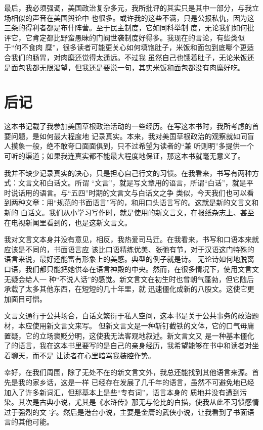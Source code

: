 ﻿\documentclass[11pt]{article}
\begin{document}
最后，我必须强调，美国政治复杂多元，我所批评的其实只是其中一部分，与我立场相似的声音在美国舆论中
也很多。或许我的这些不满，只是公报私仇，因为这三条的得利者都是布什阵营。至于民主制度，它如同科举制
度，无论我们如何批评它，它肯定都比野蛮愚昧的门阀世袭制度好得多。我现在的言论，有些类似于``何不食肉
糜''，很多读者可能更关心如何填饱肚子，米饭和面包到底哪个更适合我们的肠胃，对肉糜还觉得太遥远。不过我
虽然自己也饿着肚子，无论米饭还是面包我都无限渴望，但我还是要说一句，其实米饭和面包都没有肉糜好吃。

\section{后记}

这本书记载了我参加美国草根政治活动的一些经历。在写这本书时，我所考虑的首要问题，是如何最大程度地
记录真实。本来，我对美国草根政治的观察就如同盲人摸象一般，绝不敢夸口面面俱到，只不过希望为读者的``兼
听则明''多提供一个可听的渠道；如果我连真实都不能最大程度地保证，那这本书就毫无意义了。

我并不缺少记录真实的决心，只是担心自己行文的习惯。在我看来，书写有两种方式：文言文和白话文。所谓
``文言''，就是写文章用的语言，所谓``白话''，就是平时说话用的语言。与``五四''时期的文言文与白话文之争
类似，今天我们也可以看到两种文章：用``规范的书面语言''写的，和用口头语言写的。这就是新的文言文和新的
白话文。我们从小学习写作时，就是使用的新文言文，在报纸杂志上、甚至在电视新闻里看到的，也是这新文言文。

我对文言文本身并没有意见，相反，我热爱司马迁。在我看来，书写和口语本来就应该是不同的，书面语言应
该比口语精练优美、张弛有节，对于汉语这门特殊的语言来说，最好还能富有形象上的美感。典型的例子就是诗。
无论诗如何地脱离口语，我们都只能把她供奉在语言神殿的中央。然而，在很多情况下，使用文言文无疑会给人一
种``不说人话''的感觉。新文言文在初生时也曾朝气蓬勃，但它随后承载了太多其他东西，在短短的几十年里，就
迅速僵化成新的八股文。这使它更加面目可憎。

文言文通行于公共场合，白话文繁衍于私人空间，这本书是关于公共事务的政治题材，本应使用新文言文来写。
但新文言文是一种斩钉截铁的文体，它的口气毋庸置疑，它的立场褒贬分明，这使我无法客观地叙述。新文言文又
是一种基本僵化了的语言，我在这本书里要写的是自己的亲身经历，我希望能够在书中和读者对坐着聊天，而不是
让读者在心里暗骂我装腔作势。

幸好，在我们周围，除了无处不在的新文言文外，我总还能找到其他语言来源。首先是我的家乡话，这是一样
已经存在发展了几千年的语言，虽然不可避免地已经加入了许多新词汇，但那基本上是些``专有词''，语言本身的
质地并没有遭到污染。其次是古典小说，尤其是《水浒传》那无与伦比的白描，使我从此不习惯感情过于强烈的文
字。然后是港台小说，主要是金庸的武侠小说，让我看到了书面语言的其他可能。
\end{document}
